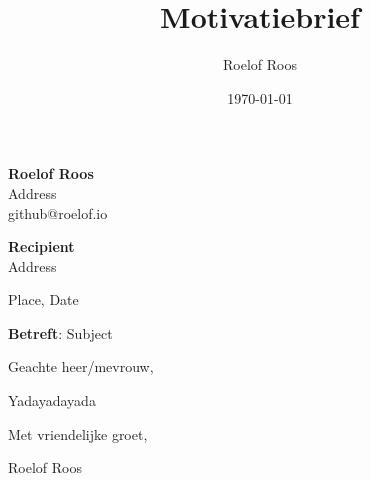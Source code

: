 \documentclass[12pt, a4paper]{article}
\title{Motivatiebrief}
\date{\today{}}
\author{Roelof Roos}
\newcommand{\letterskip}{\hspace{\parskip}\par}
\begin{document}


    \textbf{Roelof Roos} \\
    Address \\
    github@roelof.io
    \par

    \textbf{Recipient} \\
    Address

    \letterskip

    Place, Date
    \par
    \textbf{Betreft}: Subject

    \letterskip

    Geachte heer/mevrouw,

    \par

    Yadayadayada

    Met vriendelijke groet,

    Roelof Roos
\end{document}
